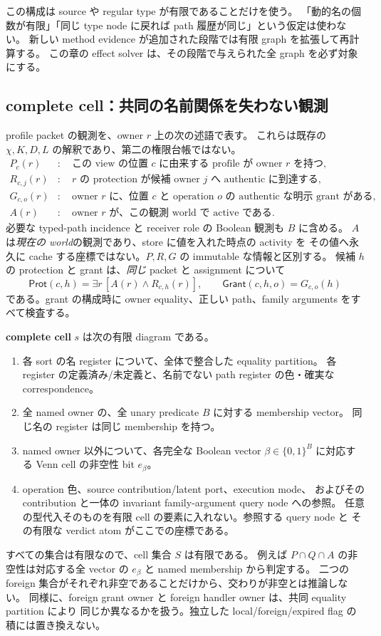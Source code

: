 \documentclass[11pt,a4paper]{article}
\theoremstyle{remark}
\begin{document}
この構成は source や regular type が有限であることだけを使う。
「動的名の個数が有限」「同じ type node に戻れば path 履歴が同じ」という仮定は使わない。
新しい method evidence が追加された段階では有限 graph を拡張して再計算する。
この章の effect solver は、その段階で与えられた全 graph を必ず対象にする。

\subsection{complete cell：共同の名前関係を失わない観測}

profile packet の観測を、owner $r$ 上の次の述語で表す。
これらは既存の $\chi,K,D,L$ の解釈であり、第二の権限台帳ではない。
\begin{align*}
 P_c(r)&:\quad \text{この view の位置 $c$ に由来する profile が owner $r$ を持つ},\\
 R_{c,j}(r)&:\quad \text{$r$ の protection が候補 owner $j$ へ authentic に到達する},\\
 G_{c,o}(r)&:\quad \text{owner $r$ に、位置 $c$ と operation $o$ の authentic な明示 grant がある},\\
 A(r)&:\quad \text{owner $r$ が、この観測 world で active である}.
\end{align*}
必要な typed-path incidence と receiver role の Boolean 観測も $B$ に含める。
$A$ は\emph{現在の world}の観測であり、store に値を入れた時点の activity を
その値へ永久に cache する座標ではない。$P,R,G$ の immutable な情報と区別する。
候補 $h$ の protection と grant は、\emph{同じ} packet と assignment について
\[
 \mathsf{Prot}(c,h)=\exists r\,[A(r)\land R_{c,h}(r)],
 \qquad \mathsf{Grant}(c,h,o)=G_{c,o}(h)
\]
である。grant の構成時に owner equality、正しい path、family arguments をすべて検査する。

\textbf{complete cell} $s$ は次の有限 diagram である。
\begin{enumerate}
\item 各 sort の名 register について、全体で整合した equality partition。
  各 register の定義済み/未定義と、名前でない path register の色・確実な correspondence。
\item 全 named owner の、全 unary predicate $B$ に対する membership vector。
  同じ名の register は同じ membership を持つ。
\item named owner 以外について、各完全な Boolean vector
  $\beta\in\{0,1\}^{B}$ に対応する Venn cell の非空性 bit $e_\beta$。
\item operation 色、source contribution/latent port、execution mode、
  およびその contribution と一体の invariant family-argument query node への参照。
  任意の型代入そのものを有限 cell の要素に入れない。参照する query node と
  その有限な verdict atom がここでの座標である。
\end{enumerate}
すべての集合は有限なので、cell 集合 $S$ は有限である。
例えば $P\cap Q\cap A$ の非空性は対応する全 vector の $e_\beta$ と
named membership から判定する。
二つの foreign 集合がそれぞれ非空であることだけから、交わりが非空とは推論しない。
同様に、foreign grant owner と foreign handler owner は、共同 equality partition により
同じか異なるかを扱う。独立した local/foreign/expired flag の積には置き換えない。
\end{document}
